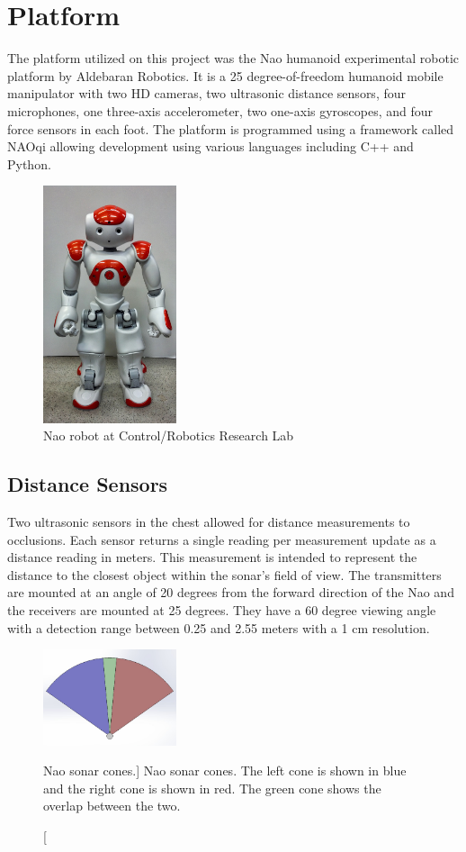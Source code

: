 \chapter{Platform}

The platform utilized on this project was the Nao humanoid experimental robotic platform by Aldebaran Robotics. It is a 25 degree-of-freedom humanoid mobile manipulator with two HD cameras, two ultrasonic distance sensors, four microphones, one three-axis accelerometer, two one-axis gyroscopes, and four force sensors in each foot. The platform is programmed using a framework called NAOqi allowing development using various languages including C++ and Python. 

\begin{figure}[h]
	\centering
	\includegraphics[width=0.35\textwidth]{nao1.jpg}
	\caption
	{Nao robot at Control/Robotics Research Lab}
	\label{fig:nao1}
\end{figure}

\section{Distance Sensors}
Two ultrasonic sensors in the chest allowed for distance measurements to occlusions. Each sensor returns a single reading per measurement update as a distance reading in meters. This measurement is intended to represent the distance to the closest object within the sonar's field of view.
The transmitters are mounted at an angle of 20 degrees from the forward direction of the Nao and the receivers are mounted at 25 degrees. They have a 60 degree viewing angle with a detection range between 0.25 and 2.55 meters with a 1 cm resolution. 

\begin{figure}[h]
	\centering
	\includegraphics[width=0.35\textwidth]{sonar1.jpg}
	\caption
	[Nao sonar cones.]
	{Nao sonar cones. The left cone is shown in blue and the right cone is shown in red. The green cone shows the overlap between the two.}
	\label{fig:sonar1}
\end{figure}


